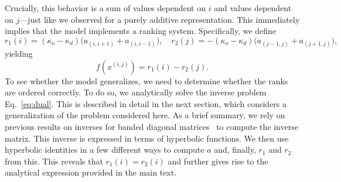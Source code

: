 \documentclass{article}
\theoremstyle{plain}
\begin{document}
Crucially, this behavior is a sum of values dependent on $i$ and values dependent on $j$---just like we observed for a purely additive representation. This immediately implies that the model implements a ranking system. Specifically, we define
\begin{equation}
    r_1(i)=(\kappa_o-\kappa_d)\bigl(a_{(i,i+1)}+a_{(i,i-1)}\bigr),\quad r_2(j)=-(\kappa_o-\kappa_d)\bigl(a_{(j-1,j)}+a_{(j+1,j)}\bigr),
\end{equation}
yielding
\begin{equation}
    f(x^{(i,j)})=r_1(i)-r_2(j).
\end{equation}
To see whether the model generalizes, we need to determine whether the ranks are ordered correctly. To do so, we analytically solve the inverse problem Eq.~\eqref{eq:dual}. This is described in detail in the next section, which considers a generalization of the problem considered here. As a brief summary, we rely on previous results on inverses for banded diagonal matrices~\cite{TODO_ref8} to compute the inverse matrix. This inverse is expressed in terms of hyperbolic functions. We then use hyperbolic identities in a few different ways to compute $a$ and, finally, $r_1$ and $r_2$ from this. This reveals that $r_1(i)=r_2(i)$ and further gives rise to the analytical expression provided in the main text.
\end{document}
